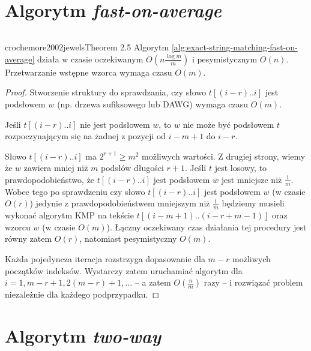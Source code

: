 \section{Algorytm \emph{fast-on-average}}

\begin{code}
\inputminted{python}{code/exact-string-matching/fast-on-average.py}
\label{alg:exact-string-matching-fast-on-average}
\end{code}

\begin{theorem}{crochemore2002jewels}{Theorem 2.5}
  Algorytm \ref{alg:exact-string-matching-fast-on-average} działa w czasie oczekiwanym $O\left(n \frac{\log{m}}{m}\right)$ i pesymistycznym $O(n)$. Przetwarzanie wstępne wzorca wymaga czasu $O(m)$.
\end{theorem}

\begin{proof}
  Stworzenie struktury do sprawdzania, czy słowo $t[(i - r)..i]$ jest podsłowem $w$ (np. drzewa sufiksowego lub DAWG) wymaga czasu $O(m)$.
  
  Jeśli $t[(i - r)..i]$ nie jest podsłowem $w$, to $w$ nie może być podsłowem $t$ rozpoczynającym się na żadnej z pozycji od $i - m + 1$ do $i - r$.
  
  Słowo $t[(i - r)..i]$ ma $2^{r + 1} \ge m^2$ możliwych wartości. Z drugiej strony, wiemy że $w$ zawiera mniej niż $m$ podsłów długości $r + 1$.
  Jeśli $t$ jest losowy, to prawdopodobieństwo, że $t[(i - r)..i]$ jest podsłowem $w$ jest mniejsze niż $\frac{1}{m}$.
  Wobec tego po sprawdzeniu czy słowo $t[(i - r)..i]$ jest podsłowem $w$ (w czasie $O(r)$) jedynie z prawdopodobieństwem mniejszym niż $\frac{1}{m}$ będziemy musieli wykonać algorytm KMP na tekście $t[(i - m + 1)..(i - r + m - 1)]$ oraz wzorcu $w$ (w czasie $O(m)$). Łączny oczekiwany czas działania tej procedury jest równy zatem $O(r)$, natomiast pesymistyczny $O(m)$.
  
  Każda pojedyncza iteracja rozstrzyga dopasowanie dla $m - r$ możliwych początków indeksów. Wystarczy zatem uruchamiać algorytm dla $i = 1, m - r + 1, 2 (m - r) + 1, \ldots$ -- a zatem $O\left(\frac{n}{m}\right)$ razy -- i rozwiązać problem niezależnie dla każdego podprzypadku.
\end{proof}

\section{Algorytm \emph{two-way}}

